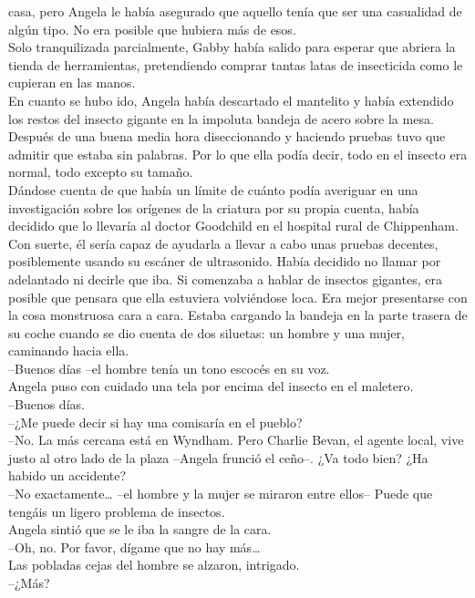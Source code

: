 {casa, pero Angela le había asegurado que aquello tenía que ser una
casualidad de algún tipo. No era posible que hubiera más de esos.\\
Solo tranquilizada parcialmente, Gabby había salido para esperar que
abriera la tienda de herramientas, pretendiendo comprar tantas latas de
insecticida como le cupieran en las manos.\\
En cuanto se hubo ido, Angela había descartado el mantelito y había
extendido los restos del insecto gigante en la impoluta bandeja de acero
sobre la mesa. Después de una buena media hora diseccionando y haciendo
pruebas tuvo que admitir que estaba sin palabras. Por lo que ella podía
decir, todo en el insecto era normal, todo excepto su tamaño.\\
Dándose cuenta de que había un límite de cuánto podía averiguar en una
investigación sobre los orígenes de la criatura por su propia cuenta,
había decidido que lo llevaría al doctor Goodchild en el hospital rural
de Chippenham. Con suerte, él sería capaz de ayudarla a llevar a cabo
unas pruebas decentes, posiblemente usando su escáner de ultrasonido.
Había decidido no llamar por adelantado ni decirle que iba. Si comenzaba
a hablar de insectos gigantes, era posible que pensara que ella
estuviera volviéndose loca. Era mejor presentarse con la cosa monstruosa
cara a cara. Estaba cargando la bandeja en la parte trasera de su coche
cuando se dio cuenta de dos siluetas: un hombre y una mujer, caminando
hacia ella.\\
--Buenos días --el hombre tenía un tono escocés en su voz.\\
Angela puso con cuidado una tela por encima del insecto en el
maletero.\\
--Buenos días.\\
--¿Me puede decir si hay una comisaría en el pueblo?\\
--No. La más cercana está en Wyndham. Pero Charlie Bevan, el agente
local, vive justo al otro lado de la plaza --Angela frunció el ceño--.
¿Va todo bien? ¿Ha habido un accidente?\\
--No exactamente\ldots{} --el hombre y la mujer se miraron entre ellos--
Puede que tengáis un ligero problema de insectos.\\
Angela sintió que se le iba la sangre de la cara.\\
--Oh, no. Por favor, dígame que no hay más\ldots{}\\
Las pobladas cejas del hombre se alzaron, intrigado.\\
--¿Más?\\
}
